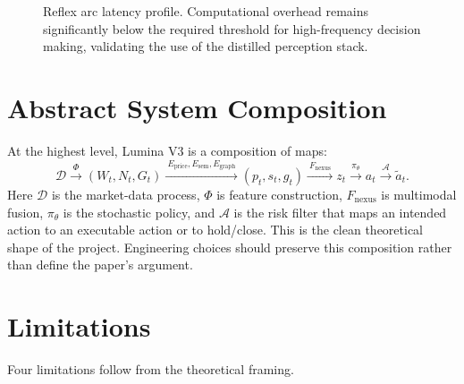 \documentclass[10pt]{article}
\begin{document}
\begin{figure}[htbp]
	\centering
	\caption{Reflex arc latency profile. Computational overhead remains significantly below the
		required threshold for high-frequency decision making, validating the use of the distilled
		perception stack.}
	\label{fig:latency-profile}
\end{figure}

\section{Abstract System Composition}

At the highest level, Lumina V3 is a composition of maps:
\[
	\mathcal{D}
	\xrightarrow{\ \Phi\ }
	(W_t,N_t,G_t)
	\xrightarrow{\ E_{\mathrm{price}},E_{\mathrm{sem}},E_{\mathrm{graph}}\ }
	(p_t,s_t,g_t)
	\xrightarrow{\ F_{\mathrm{nexus}}\ }
	z_t
	\xrightarrow{\ \pi_\theta\ }
	a_t
	\xrightarrow{\ \mathcal{A}\ }
	\tilde{a}_t.
\]
Here \(\mathcal{D}\) is the market-data process, \(\Phi\) is feature construction,
\(F_{\mathrm{nexus}}\) is multimodal fusion, \(\pi_\theta\) is the stochastic policy, and
\(\mathcal{A}\) is the risk filter that maps an intended action to an executable action or to
hold/close. This is the clean theoretical shape of the project. Engineering choices should
preserve this composition rather than define the paper's argument.

\section{Limitations}

Four limitations follow from the theoretical framing.
\end{document}
